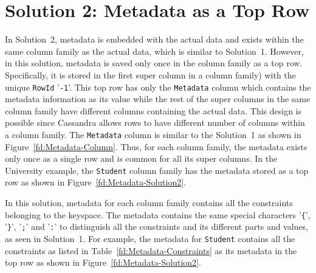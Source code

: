 
\section{Solution 2:  Metadata as a Top Row} \label{s:design-sol2}


In Solution~2,   metadata is embedded with the actual data and exists within the
same column family as the actual data, which is similar to Solution~1.
However,  in this solution,   metadata is saved only once in the column family
as a top row. Specifically, it is stored in the first super column in a column
family) with the unique \texttt{RowId} '\texttt{-1}'.  This top row has only the
\texttt{Metadata} column which contains the metadata information as its value
while the rest of the super columns in the same column family have different
columns containing the actual data.  This design is possible since Cassandra
allows rows to have different number of columns within a column family.  The
\texttt{Metadata} column is similar to the Solution~1 as shown in
Figure~\ref{fd:Metadata-Column}.  Thus,  for each column family,  the metadata
exists only once as a single row and is common for all its super columns.  In
the University example, the  \texttt{Student} column family has the metadata 
stored as a top row as  shown in Figure~\ref{fd:Metadata-Solution2}.
		 		

In this solution, metadata  for each column family contains all the constraints
belonging to the keyspace. The metadata contains the same special characters
'\texttt{\{}',  '\texttt{\}}', '\texttt{;}' and '\texttt{:}' to distinguish all
the constraints and its different parts and values, as seen in
Solution~1. For example, the metadata for \texttt{Student}  contains
all the constraints as listed in Table~\ref{fd:Metadata-Constraints} as its
metadata in the top row as shown in Figure~\ref{fd:Metadata-Solution2}.


% 
	
